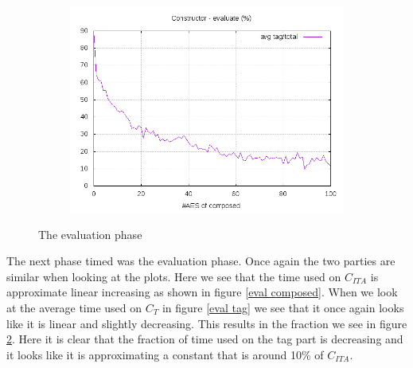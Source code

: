 \documentclass[10pt,a4paper]{article}
\begin{document}
\begin{figure}[h]
\begin{subfigure}[t]{0.3\textwidth}
        \includegraphics[width=\textwidth]{const_eval_frac}
        \caption{}
        \label{eval frac}
    \end{subfigure}
    \caption{The evaluation phase}
\end{figure}

The next phase timed was the evaluation phase.
Once again the two parties are similar when looking at the plots. Here we see that the time used on $C_{ITA}$ is approximate linear increasing as shown in figure \ref{eval composed}. When we look at the average time used on $C_T$ in figure \ref{eval tag} we see that it once again looks like it is linear and slightly decreasing. This results in the fraction we see in figure \ref{eval frac}. Here it is clear that the fraction of time used on the tag part is decreasing and it looks like it is approximating a constant that is around 10\% of $C_{ITA}$.
\end{document}

